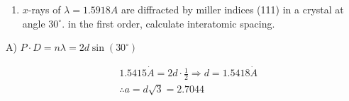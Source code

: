 \documentclass[10pt]{article}
\begin{document}
\begin{enumerate}
  \item $x$-rays of $\lambda=1.5918 A$ are diffracted by miller indices (111) in a crystal at angle $30^{\circ}$. in the first order, calculate interatomic spacing.
\end{enumerate}

A) $P \cdot D=n \lambda=2 d \sin \left(30^{\circ}\right)$

$$
\begin{aligned}
& 1.5415 \dot{A}=2 d \cdot \frac{1}{2} \Rightarrow d=1.5418 \dot{A} \\
& \therefore a=d \sqrt{3}=2.7044
\end{aligned}
$$
\end{document}
